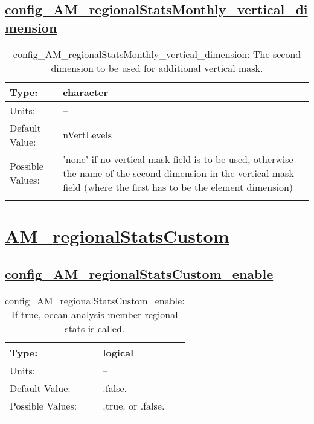 \subsection[config\_AM\_regionalStatsMonthly\_vertical\_dimension]{\hyperref[sec:nm_tab_AM_regionalStatsMonthly]{config\_AM\_regionalStatsMonthly\_vertical\_dimension}}
\label{subsec:nm_sec_config_AM_regionalStatsMonthly_vertical_dimension}
\begin{center}
\begin{longtable}{| p{2.0in} || p{4.0in} |}
    \hline
    Type: & character \\
    \hline
    Units: & -- \\
    \hline
    Default Value: & nVertLevels \\
    \hline
    Possible Values: & 'none' if no vertical mask field is to be used, otherwise the name of the second dimension in the vertical mask field (where the first has to be the element dimension) \\
    \hline
    \caption{config\_AM\_regionalStatsMonthly\_vertical\_dimension: The second dimension to be used for additional vertical mask.}
\end{longtable}
\end{center}
\section[AM\_regionalStatsCustom]{\hyperref[sec:nm_tab_AM_regionalStatsCustom]{AM\_regionalStatsCustom}}
\label{sec:nm_sec_AM_regionalStatsCustom}
\subsection[config\_AM\_regionalStatsCustom\_enable]{\hyperref[sec:nm_tab_AM_regionalStatsCustom]{config\_AM\_regionalStatsCustom\_enable}}
\label{subsec:nm_sec_config_AM_regionalStatsCustom_enable}
\begin{center}
\begin{longtable}{| p{2.0in} || p{4.0in} |}
    \hline
    Type: & logical \\
    \hline
    Units: & -- \\
    \hline
    Default Value: & .false. \\
    \hline
    Possible Values: & .true. or .false. \\
    \hline
    \caption{config\_AM\_regionalStatsCustom\_enable: If true, ocean analysis member regional stats is called.}
\end{longtable}
\end{center}
